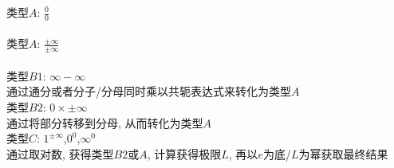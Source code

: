 \documentclass[UTF8, fontset=ubuntu]{ctexart}
\begin{document}
类型$A$: $\displaystyle\frac{0}{0}$\\
\\

类型$A$: $\displaystyle\frac{\pm\infty}{\pm\infty}$\\
\\

类型$B1$: $\infty -\infty$\\
通过通分或者分子/分母同时乘以共轭表达式来转化为类型$A$\\

类型$B2$: $0\times\pm\infty$\\
通过将部分转移到分母, 从而转化为类型$A$\\

类型$C$: $1^{\pm\infty}$,$0^0$,$\infty^0$\\
通过取对数, 获得类型$B2$或$A$, 计算获得极限$L$, 再以$e$为底/$L$为幂获取最终结果
\end{document}
